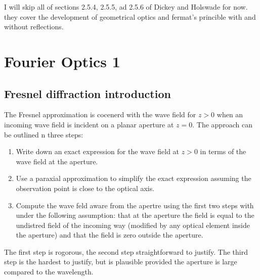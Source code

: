 \documentclass[../../main.tex]{subfiles} %
\begin{document}
I will skip all of sections 2.5.4, 2.5.5, ad 2.5.6 of Dickey and Holswade for now. they cover the development of geometrical optics and fermat's princible with and without reflections. 
\section{Fourier Optics 1}
\subsection{Fresnel diffraction introduction}
The Fresnel approximation is cocenerd with the wave field for $z>0$ when an incoming wave field is incident on a planar aperture at $z=0$. The approach can be outlined n three steps:
\begin{enumerate}
    \item Write down an exact expression for the wave field at $z>0$ in terms of the wave field at the aperture.
    \item Use a paraxial approximation to simplify the exact expression assuming the observation point is close to the optical axis.
    \item Compute the wave feld aware from the apertre using the first two steps with under the following assumption: that at the aperture the field is equal to the undistred field of the incoming way (modified by any optical element inside the aperture) and that the field is zero outside the aperture.
\end{enumerate}
The first step is rogorous, the second step straightforward to justify. The third step is the hardest to justify, but is plausible provided the aperture is large compared to the wavelength.
\end{document}
